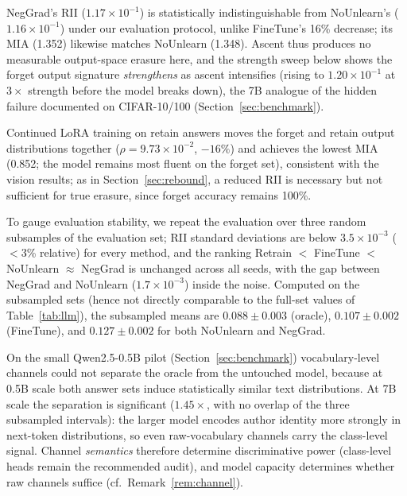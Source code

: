 \documentclass[smallextended]{svjour3}       %
\begin{document}
NegGrad's RII ($1.17{\times}10^{-1}$) is statistically indistinguishable from NoUnlearn's ($1.16{\times}10^{-1}$) under our evaluation protocol, unlike FineTune's 16\% decrease; its MIA (1.352) likewise matches NoUnlearn (1.348). Ascent thus produces no measurable output-space erasure here, and the strength sweep below shows the forget output signature \emph{strengthens} as ascent intensifies (rising to $1.20{\times}10^{-1}$ at $3\times$ strength before the model breaks down), the 7B analogue of the hidden failure documented on CIFAR-10/100 (Section~\ref{sec:benchmark}).

Continued LoRA training on retain answers moves the forget and retain output distributions together ($\rho{=}9.73{\times}10^{-2}$, $-16\%$) and achieves the lowest MIA (0.852; the model remains most fluent on the forget set), consistent with the vision results; as in Section~\ref{sec:rebound}, a reduced RII is necessary but not sufficient for true erasure, since forget accuracy remains 100\%.

To gauge evaluation stability, we repeat the evaluation over three random subsamples of the evaluation set; RII standard deviations are below $3.5{\times}10^{-3}$ ($<$3\% relative) for every method, and the ranking Retrain $<$ \allowbreak FineTune $<$ \allowbreak NoUnlearn ${\approx}$ \allowbreak NegGrad is unchanged across all seeds, with the gap between NegGrad and NoUnlearn ($1.7{\times}10^{-3}$) inside the noise. Computed on the subsampled sets (hence not directly comparable to the full-set values of Table~\ref{tab:llm}), the subsampled means are $0.088\pm0.003$ (oracle), $0.107\pm0.002$ (FineTune), and $0.127\pm0.002$ for both NoUnlearn and NegGrad.

On the small Qwen2.5-0.5B pilot (Section~\ref{sec:benchmark}) vocabulary-level channels could not separate the oracle from the untouched model, because at 0.5B scale both answer sets induce statistically similar text distributions. At 7B scale the separation is significant ($1.45\times$, with no overlap of the three subsampled intervals): the larger model encodes author identity more strongly in next-token distributions, so even raw-vocabulary channels carry the class-level signal. Channel \emph{semantics} therefore determine discriminative power (class-level heads remain the recommended audit), and model capacity determines whether raw channels suffice (cf.\ Remark~\ref{rem:channel}).
\end{document}
